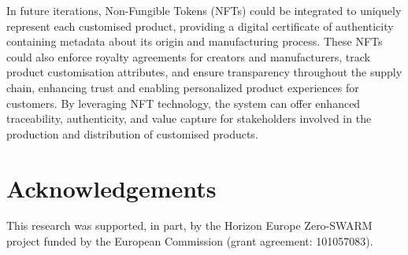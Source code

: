 \documentclass[conference]{IEEEtran}
\begin{document}
In future iterations, Non-Fungible Tokens (NFTs) could be integrated to uniquely represent each customised product, providing a digital certificate of authenticity containing metadata about its origin and manufacturing process. These NFTs could also enforce royalty agreements for creators and manufacturers, track product customisation attributes, and ensure transparency throughout the supply chain, enhancing trust and enabling personalized product experiences for customers. By leveraging NFT technology, the system can offer enhanced traceability, authenticity, and value capture for stakeholders involved in the production and distribution of customised products.


\section{Acknowledgements}
This research was supported, in part, by the Horizon Europe Zero-SWARM project funded by the European Commission (grant agreement: 101057083).




\end{document}
